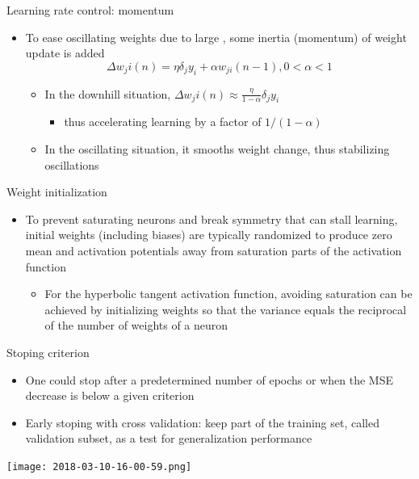 \documentclass[notes]{beamer}
\providecommand{\tightlist}{%
  \setlength{\itemsep}{0pt}\setlength{\parskip}{0pt}}
\begin{document}
\begin{frame}{Learning rate control: momentum}

\begin{itemize}
\item
  To ease oscillating weights due to large , some inertia (momentum) of
  weight update is added
  \[     \Delta   w_ ji (n) = \eta \delta_ j y_i + \alpha w_ {ji} (n - 1),                        0 < \alpha < 1\]

  \begin{itemize}
  \tightlist
  \item
    In the downhill situation,
    \(\Delta w_ ji (n)\approx \frac{\eta}{1-\alpha} \delta _ j y_i\)

    \begin{itemize}
    \tightlist
    \item
      thus accelerating learning by a factor of \(1/(1 - \alpha )\)
    \end{itemize}
  \item
    In the oscillating situation, it smooths weight change, thus
    stabilizing oscillations
  \end{itemize}
\end{itemize}

\end{frame}

\begin{frame}{Weight initialization}

\begin{itemize}
\tightlist
\item
  To prevent saturating neurons and break symmetry that can stall
  learning, initial weights (including biases) are typically randomized
  to produce zero mean and activation potentials away from saturation
  parts of the activation function

  \begin{itemize}
  \tightlist
  \item
    For the hyperbolic tangent activation function, avoiding saturation
    can be achieved by initializing weights so that the variance equals
    the reciprocal of the number of weights of a neuron
  \end{itemize}
\end{itemize}

\end{frame}

\begin{frame}{Stoping criterion}

\begin{itemize}
\tightlist
\item
  One could stop after a predetermined number of epochs or when the MSE
  decrease is below a given criterion
\item
  Early stoping with cross validation: keep part of the training set,
  called validation subset, as a test for generalization performance
\end{itemize}

\centering 

\texttt{[image: 2018-03-10-16-00-59.png]} ~

\end{frame}
\end{document}
